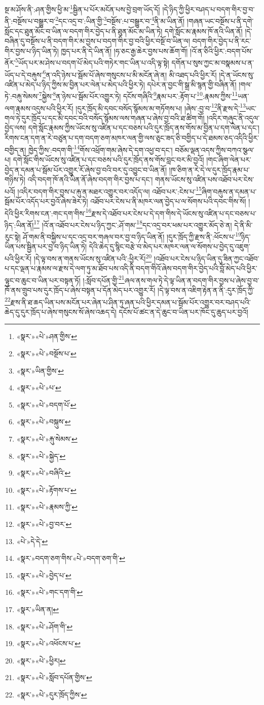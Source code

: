 སྔ་མ་ཤོས་ནི་:ཤན་གྱིས་ཕྱི་མ་\footnote{«སྣར་»«པེ་»ཤན་གྱིས་}སྦྱིན་པ་པོར་མངོན་པས་བྱེ་བྲག་ཡོད་དོ། །དེ་ཉིད་ཀྱི་ཕྱིར་བཤད་པ་བདག་གིར་བྱ་བ་ནི་:བསྔོས་པ་བསྒྱུར་བ་\footnote{«སྣར་»«པེ་»བསྔོས་པ་}དང་འདྲ་བ་:ཡིན་གྱི་\footnote{«སྣར་»ཡིན་གྱིས་}བསྔོས་:པ་བསྒྱུར་བ་\footnote{«སྣར་»«པེ་»པ་}ནི་མ་ཡིན་ནོ། །གཞན་ཡང་བསྔོས་པ་ནི་དགེ་སློང་དང་ཐུན་མོང་བ་ཡིན་ལ་བདག་གིར་བྱེད་པ་ནི་ཐུན་མོང་མ་ཡིན་ཏེ། དགེ་སློང་མ་རྣམས་ཁོ་ནའི་ཡིན་ནོ། །དེ་བཞིན་དུ་བསྔོས་པ་ནི་བདག་གིར་མ་བྱས་པ་བདག་གིར་བྱ་བའི་ཕྱིར་བསྔོ་བ་ཡིན་ལ། བདག་གིར་བྱེད་པ་ནི་རང་གིར་བྱས་པ་ཉིད་ཡིན་ཏེ། ཁྱད་པར་ནི་དེ་ཡིན་ནོ། །ཧ་ཅང་རྒྱ་ཆེར་བྱས་པས་ཆོག་གོ། །འོ་ན་ཅིའི་ཕྱིར་:བདག་པོས་ནོར་\footnote{«སྣར་»«པེ་»བདག་པོ་}ཡོད་པར་མ་ཤེས་པ་བདག་པོ་མེད་པའི་གཏེར་གང་ཡིན་པ་འདི་ལྟ་སྟེ། དགོན་པ་སུས་ཀྱང་མ་བསྣམས་པ་ན་ཡོད་པ་དེ་བརྐུས་\footnote{«སྣར་»«པེ་»བསྐུས་}ན་འདི་ཉེས་པ་སྦོམ་པོ་ཞེས་གསུངས་པ་མི་མངོན་ཞེ་ན། མི་འཐད་པའི་ཕྱིར་རོ། །དེ་ན་ཡོངས་སུ་འཛིན་པ་མེད་པ་ཉིད་ཀྱིས་མ་བྱིན་པར་ལེན་པ་མེད་པའི་ཕྱིར་ཏེ། དཔེར་ན་བྱང་གི་སྒྲ་མི་སྙན་གྱི་བཞིན་ནོ། །གལ་ཏེ་:བརྐུ་སེམས་\footnote{«སྣར་»«པེ་»རྐུ་སེམས་}སྐྱེས་\footnote{«སྣར་»«པེ་»སྐྱེད་}ན་ཉེས་པ་སྦོམ་པོར་འགྱུར་ཏེ། དངོས་གཞིའི་\footnote{«སྣར་»«པེ་»བཞིའི་}རྣམ་པར་:རྟོག་པ་\footnote{«སྣར་»«པེ་»རྟོགས་པ་}:རྣམས་ཀྱིས་\footnote{«སྣར་»«པེ་»རྣམས་ཀྱི་}ཡན་ལག་རྣམས་འདུས་པའི་ཕྱིར་རོ། །དུར་ཁྲོད་མི་དབང་བསོད་སྙོམས་མ་གཏོགས་པ། །ཞེས་:བྱ་བ་\footnote{«སྣར་»«པེ་»བྱ་བར་}ནི་རྫས་དེ་\footnote{«པེ་»དེ་དེ་}ཡང་གལ་ཏེ་དུར་ཁྲོད་པ་དང་མི་དབང་བའི་བསོད་སྙོམས་ལས་གཞན་པ་ཞེས་བྱ་བའི་ཐ་ཚིག་གོ། །འདིར་གཞུང་ནི་འདུལ་བྱེད་ལས། དགེ་སློང་རྣམས་ཀྱིས་ཡོངས་སུ་འཛིན་པ་དང་བཅས་པའི་དུར་ཁྲོད་ནས་གོས་མ་བྱིན་པ་དག་ལེན་པ་དང་། རིགས་ངན་དག་ན་རེ་བཙུན་པ་དག་བདག་ཅག་མཁར་ལན་གྱི་ལས་ཅུང་ཟད་ཅི་བགྱིད་པ་དེ་ཐམས་ཅད་འདིའི་ཕྱིར་བགྱིད་ན། ཁྱེད་ཀྱིས་:བདག་གི་\footnote{«སྣར་»བདག་ཅག་གིས་«པེ་»བདག་ཅག་གི་}གོས་འཕྲོག་གམ་ཞེས་དེ་དག་འཕྱ་བ་དང་། བཅོམ་ལྡན་འདས་ཀྱིས་བཀའ་སྩལ་པ། དགེ་སློང་གིས་ཡོངས་སུ་འཛིན་པ་དང་བཅས་པའི་དུར་ཁྲོད་ནས་གོས་བླང་བར་མི་བྱའོ། །གང་ཞིག་ལེན་པར་བྱེད་ན་དམན་པ་སྦོམ་པོར་འགྱུར་རོ་ཞེས་བྱ་བའི་བར་དུ་འབྱུང་བ་ཡིན་ནོ། །ཁ་ཅིག་ན་རེ་དེ་ལ་དུར་ཁྲོད་རྣམ་པ་གཉིས་ཏེ། འདི་བདག་ཁོ་ནའི་ཡིན་ནོ་ཞེས་བདག་གིར་བྱས་པ་དང་། གནས་ཡོངས་སུ་འཛིན་པས་འཐོབ་པར་ངེས་པའོ། །འདིར་བདག་གིར་བྱས་པ་རྐུ་ན་མཐར་འགྱུར་བར་འདོད་ལ། འཐོབ་པར་:ངེས་པ་\footnote{«སྣར་»«པེ་»བྱེད་པ་}ཞིག་བརྐུས་ན་དམན་པ་སྦོམ་པོར་འདོད་པར་བྱའོ་ཞེས་ཟེར་ཏེ། འཐོབ་པར་ངེས་པ་ནི་མཁར་ལན་བྱེད་པ་ལ་སོགས་པའི་དབང་གིས་སོ། །དེའི་ཕྱིར་རིགས་ངན་:གང་དག་གིས་\footnote{«སྣར་»«པེ་»གང་དག་གི་}རྫས་དེ་འཐོབ་པར་ངེས་པ་དེ་དག་གིས་དེ་ཡོངས་སུ་འཛིན་པ་དང་བཅས་པ་ཉིད་:ཡིན་ནོ།\footnote{«སྣར་»ཡིན་ན།} །འོ་ན་འཐོབ་པར་ངེས་པ་ཉིད་ཀྱང་:ཤོ་གམ་\footnote{«སྣར་»«པེ་»ཤོག་གི་}དང་འདྲ་བར་ཕམ་པར་འགྱུར་མོད་ཅེ་ན། དེ་ནི་མི་རུང་སྟེ། ཤོ་གམ་ནི་བསྐྱིས་པ་དང་འདྲ་བར་གཞལ་བར་བྱ་བ་ཉིད་ཡིན་ནོ། །དུར་ཁྲོད་ཀྱི་རྫས་ནི་:ཕོངས་པ་\footnote{«སྣར་»«པེ་»འཕོངས་པ་}ཉིད་ཡིན་པས་སྦྱིན་པར་བྱ་བ་ཉིད་ཡིན་ཏེ། དེའི་ཆེད་དུ་སྙིང་བརྩེ་བ་མེད་པར་མཁར་ལན་ལ་སོགས་པ་བྱེད་དུ་འཇུག་པའི་ཕྱིར་རོ། །དེ་ལྟ་བས་ན་གནས་ཡོངས་སུ་འཛིན་པའི་:ཕྱིར་རོ།\footnote{«སྣར་»«པེ་»ཕྱིར།} །འཐོབ་པར་ངེས་པ་ཉིད་ཡིན་དུ་ཟིན་ཀྱང་འཐོབ་པ་དང་ལྡན་པ་རྣམས་ལ་རྫས་དེ་ལག་ཏུ་མ་ཐོབ་པས་འདི་ནི་བདག་གིའོ་ཞེས་བདག་གིར་བྱེད་པའི་བློ་མེད་པའི་ཕྱིར་ལྟུང་བ་ཆུང་བ་ཡིན་པར་བསྟན་ཏོ། །:སློབ་དཔོན་གྱི་\footnote{«སྣར་»«པེ་»སློབ་དཔོན་གྱིས་}ཞལ་ནས་གལ་ཏེ་དེ་ལྟ་ཡིན་ན་བདག་གིར་བྱས་པ་ཞེས་བྱ་བ་ཁོ་ནས་གྲུབ་པས་དུར་ཁྲོད་པ་ཞེས་བསྟན་པ་དོན་མེད་པར་འགྱུར་རོ། །དེ་ལྟ་བས་ན་འཇིག་རྟེན་ན་ནི་:དུར་ཁྲོད་ཀྱི་\footnote{«སྣར་»«པེ་»དུར་ཁྲོད་ཀྱིས་}རྫས་ནི་ཐ་ཆད་ཡིན་པས་མངོན་པར་ཞེན་པ་ཤིན་ཏུ་ཞན་པའི་ཕྱིར་དམན་པ་སྦོམ་པོར་འགྱུར་བར་བཤད་པའི་ཆེད་དུ་དུར་ཁྲོད་པ་ཞེས་གསུངས་སོ་ཞེས་འཆད་དེ། དངོས་པོ་ཚང་ན་དེ་ཆུང་བ་ཡིན་པར་ཁོང་དུ་ཆུད་པར་བྱའོ། 